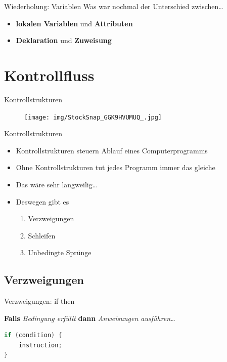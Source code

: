\documentclass[18pt]{beamer}
\begin{document}
\begin{frame}{Wiederholung: Variablen}
    Was war nochmal der Unterschied zwischen\dots
    \vspace{.2in}
    \begin{itemize}
        \item \textbf{lokalen Variablen} und \textbf{Attributen}
        \pause
        \item \textbf{Deklaration} und \textbf{Zuweisung}
    \end{itemize}
\end{frame}

\section{Kontrollfluss}

\begin{frame}{Kontrollstrukturen}
    \begin{figure}
        \texttt{[image: img/StockSnap\_GGK9HVUMUQ\_.jpg]}
    \end{figure}
\end{frame}


\begin{frame}{Kontrollstrukturen}
    \begin{itemize}
        \item Kontrollstrukturen steuern Ablauf eines Computerprogramms
        \pause
        \item Ohne Kontrollstrukturen tut jedes Programm immer das gleiche
        \pause
        \item Das wäre sehr langweilig\dots
        \pause
        \vspace{.2in}
        \item Deswegen gibt es
        \begin{enumerate}
            \item Verzweigungen
            \item Schleifen
            \item Unbedingte Sprünge
        \end{enumerate}
    \end{itemize}
\end{frame}

\subsection{Verzweigungen}

\begin{frame}[fragile]{Verzweigungen: if-then}
    \begin{block}{}
        \textbf{Falls} \textit{Bedingung erfüllt} \textbf{dann} \textit{Anweisungen ausführen}\dots
    \end{block}
    \pause

    \begin{block}{}
        \begin{lstlisting}[language=Java]
if (condition) {
    instruction;
}
        \end{lstlisting}
    \end{block}
\end{frame}
\end{document}
